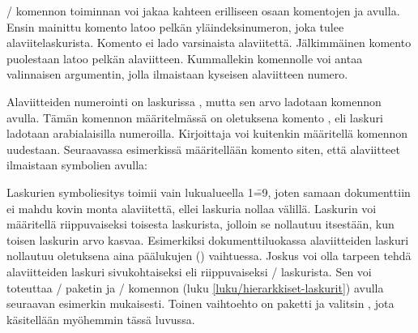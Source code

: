 \-/ komennon toiminnan voi jakaa kahteen erilliseen
osaan komentojen  ja 
avulla. Ensin mainittu komento latoo pelkän yläindeksinumeron, joka
tulee alaviitelaskurista. Komento ei lado varsinaista alaviitettä.
Jälkimmäinen komento puolestaan latoo pelkän alaviitteen. Kummallekin
komennolle voi antaa valinnaisen argumentin, jolla ilmaistaan kyseisen
alaviitteen numero.

\begin{koodilohkosis}
\footnotemark[numero]                      %
\end{koodilohkosis}

\noindent
Alaviitteiden numerointi on laskurissa , mutta sen
arvo ladotaan komennon  avulla. Tämän komennon
määritelmässä on oletuksena komento
, eli laskuri ladotaan
arabialaisilla numeroilla. Kirjoittaja voi kuitenkin määritellä komennon
uudestaan. Seuraavassa esimerkissä määritellään komento siten, että
alaviitteet ilmaistaan symbolien avulla:

\begin{koodilohkosis}
\renewcommand{\thefootnote}{\fnsymbol{footnote}}
\end{koodilohkosis}

\noindent
Laskurien symboliesitys toimii vain lukualueella 1\==9, joten samaan
dokumenttiin ei mahdu kovin monta alaviitettä, ellei laskuria nollaa
välillä. Laskurin voi määritellä riippuvaiseksi toisesta laskurista,
jolloin se nollautuu itsestään, kun toisen laskurin arvo kasvaa.
Esimerkiksi dokumenttiluokassa  alaviitteiden laskuri
nollautuu oletuksena aina päälukujen () vaihtuessa.
Joskus voi olla tarpeen tehdä alaviitteiden laskuri sivukohtaiseksi eli
riippuvaiseksi \-/ laskurista. Sen voi toteuttaa
\-/ paketin ja \-/ komennon
(luku \ref{luku/hierarkkiset-laskurit}) avulla seuraavan esimerkin
mukaisesti. Toinen vaihtoehto on paketti  ja valitsin
, jota käsitellään myöhemmin tässä luvussa.

\begin{koodilohkosis}
\end{koodilohkosis}

